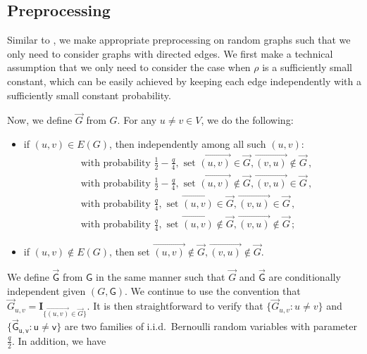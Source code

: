 \documentclass[11pt]{article}
\numberwithin{equation}{section}
\begin{document}
\subsection{Preprocessing}\label{sec:preprocessing}

Similar to \cite{DL22+}, we make appropriate preprocessing on random graphs such that we only need to consider graphs with directed edges. We first make a technical assumption that we only need to consider the case when $\rho$ is a sufficiently small constant, which can be easily achieved by keeping each edge independently with a sufficiently small constant probability. 

Now, we define $\overrightarrow G$ from $G$. For any $u \neq v \in V$, we do the following: 
\begin{itemize}
    \item if $(u,v) \in E(G)$, then independently among all such $(u,v)$:
    \begin{align*}
        & \mbox{with probability } \frac{1}{2} - \frac{q}{4}, \mbox{ set } \overrightarrow{(u,v)} \in \overrightarrow{G}, \overrightarrow{(v,u)} \not \in \overrightarrow{G}\,, \\
        & \mbox{with probability } \frac{1}{2} - \frac{q}{4}, \mbox{ set } \overrightarrow{(u,v)} \not \in \overrightarrow{G}, \overrightarrow{(v,u)} \in \overrightarrow{G} \,,\\
        & \mbox{with probability }  \frac{q}{4}, \mbox{ set } \overrightarrow{(u,v)} \in \overrightarrow{G}, \overrightarrow{(v,u)}  \in \overrightarrow{G} \,, \\
        & \mbox{with probability }  \frac{q}{4}, \mbox{ set } \overrightarrow{(u,v)} \not \in \overrightarrow{G}, \overrightarrow{(v,u)} \not \in \overrightarrow{G} \,;
    \end{align*}
    \item if $(u,v) \not \in E(G)$, then set $\overrightarrow{(u,v)} \not \in \overrightarrow{G}, \overrightarrow{(v,u)} \not \in \overrightarrow{G}$.
\end{itemize}
We define $\overrightarrow {\mathsf G}$ from $\mathsf G$ in the same manner such that $\overrightarrow G$ and $\overrightarrow {\mathsf G}$ are conditionally independent given $(G, \mathsf G)$. We continue to use the convention that $\overrightarrow G_{u, v} = \mathbf I_{ \{ \overrightarrow{(u,v)} \in \overrightarrow G \}}$.
It is then straightforward to verify that $\{ \overrightarrow{G}_{u,v} : u \neq v \}$ and $\{ \mathsf{\overrightarrow{\mathsf{G}}_{u,v} : u \neq v}  \}$ are two families of i.i.d.\ Bernoulli random variables with parameter $\frac{q}{2}$. In addition, we have
\end{document}
